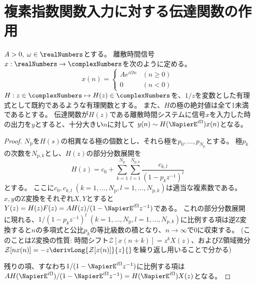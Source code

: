 		\section{複素指数関数入力に対する伝達関数の作用}
			\begin{shadebox}
				$A>0,\;\omega \in \realNumbers$とする。
				離散時間信号$x: \realNumbers \to \complexNumbers$を次のように定める。
				\[
					x(n) =
					\begin{cases}
						Ae^{i\Omega n} & (n\geq 0) \\
						0 & (n<0)
					\end{cases}
				\]
				$H: z\in\complexNumbers \mapsto H(z) \in \complexNumbers$を、$1/z$を変数とした有理式として既約であるような有理関数とする。
				また、$H$の極の絶対値は全て1未満であるとする。
				伝達関数が$H(z)$である離散時間システムに信号$x$を入力した時の出力を$y$とすると、十分大きい$n$に対して
				$y(n) \sim H(\NapierE^{i\Omega})x(n)$となる。
			\end{shadebox}
			\begin{proof}
				\quad\par
				$N_\text{p}$を$H(s)$の相異なる極の個数とし、それら極を$p_0,\dots,p_{N_\text{p}}$とする。
				極$p_k$の次数を$N_{\text{p},k}$とし、$H(z)$の部分分数展開を
				\[ H(z) = c_0 + \sum_{k=1}^{N_\mathrm{p}} \sum_{l=1}^{N_{\mathrm{p},k}} \frac{c_{k,l}}{(1-p_kz^{-1})^l} \]
				とする。
				ここに$c_0,c_{k,l}\;(k=1,\dots,N_\mathrm{p},l=1,\dots,N_{\mathrm{p},k})$は適当な複素数である。
				$x,y$のZ変換をそれぞれ$X,Y$とすると$Y(z) = H(z)F(z) = A H(z)/(1-\NapierE^{i\Omega}z^{-1})$である。
				これの部分分数展開に現れる、$1/(1-p_k z^{-1})^l\;(k=1,\dots,N_\mathrm{p},l=1,\dots,N_{\mathrm{p},k})$に比例する項は逆Z変換すると$n$の多項式と公比$p_k$の等比級数の積となり、$n\to\infty$で0に収束する。
				(このことはZ変換の性質: 時間シフト$\mathcal{Z}[x(n+k)] = z^kX(z)$、およびZ領域微分$\mathcal{Z}[nx(n)] = -z\derivLong{\mathcal{Z}[x(n)]}{z}{}$を繰り返し用いることで分かる)
				\par
				残りの項、すなわち$1/(1-\NapierE^{i\Omega}z^{-1})$に比例する項は$AH(\NapierE^{i\Omega})/(1-\NapierE^{i\Omega}z^{-1}) = H(\NapierE^{i\Omega})X(z)$となる。
			\end{proof}
